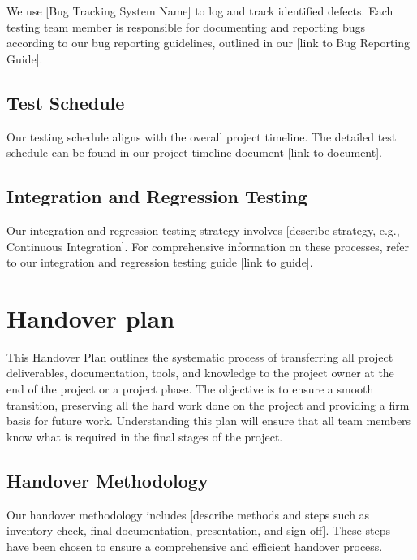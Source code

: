 \documentclass[10pt]{projectdoc}
\begin{document}
We use [Bug Tracking System Name] to log and track identified defects. Each testing team member is responsible for documenting and reporting bugs according to our bug reporting guidelines, outlined in our [link to Bug Reporting Guide].

\subsection{Test Schedule}

Our testing schedule aligns with the overall project timeline. The detailed test schedule can be found in our project timeline document [link to document].

\subsection{Integration and Regression Testing}

Our integration and regression testing strategy involves [describe strategy, e.g., Continuous Integration]. For comprehensive information on these processes, refer to our integration and regression testing guide [link to guide].

\newpage
\section{Handover plan}

\noindent This Handover Plan outlines the systematic process of transferring all project deliverables, documentation, tools, and knowledge to the project owner at the end of the project or a project phase. The objective is to ensure a smooth transition, preserving all the hard work done on the project and providing a firm basis for future work. Understanding this plan will ensure that all team members know what is required in the final stages of the project.

\subsection{Handover Methodology}

Our handover methodology includes [describe methods and steps such as inventory check, final documentation, presentation, and sign-off]. These steps have been chosen to ensure a comprehensive and efficient handover process.
\end{document}
